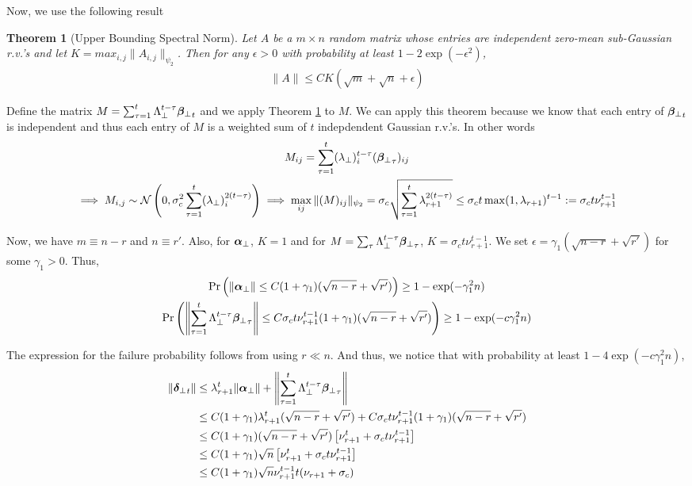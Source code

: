 \documentclass[10pt]{article}
\newtheorem{theorem}{Theorem}
\newcommand{\norm}[1]{\left\|#1\right\|}
\begin{document}
Now, we use the following result \cite[Theorem 4.4.5]{hdp_book} 
\begin{theorem}[Upper Bounding Spectral Norm] \label{thm:upper_bnd}
Let $A$ be a $m \times n$ random matrix whose entries are independent zero-mean sub-Gaussian r.v.'s and let $K = max_{i,j} \|A_{i,j}\|_{\psi_2}$. Then for any $\epsilon >0$ with probability at least $1 - 2\exp(-\epsilon^2)$,
\begin{align*}
\|A\| \leq C K (\sqrt{m} + \sqrt{n} + \epsilon) 
\end{align*}
\end{theorem}

Define the matrix $M = \sum_{\tau=1}^t \Lambda_\perp^{t-\tau}  {\bm{\beta}_{\perp}}_t$ and we apply Theorem \ref{thm:upper_bnd} to $M$. We can apply this theorem because we know that each entry of ${\bm{\beta}_{\perp}}_t$ is independent and thus each entry of $M$ is a weighted sum of $t$ indepdendent Gaussian r.v.'s. In other words
\begin{gather*}
M_{ij} = \sum_{\tau=1}^t (\lambda_\perp)_i^{t-\tau} ({\bm{\beta}_{\perp}}_{\tau})_{ij} \\
\implies M_{i,j} \sim \mathcal{N}\left(0, \sigma_c^2 \sum_{\tau=1}^t (\lambda_\perp)_i^{2(t-\tau)}\right)
\implies \max_{ij} \|(M)_{ij}\|_{\psi_2} = \sigma_c \sqrt{\sum_{\tau=1}^t \lambda_{r+1}^{2(t-\tau)}} \leq \sigma_c t \max(1, \lambda_{r+1})^{t-1} := \sigma_c t \nu_{r+1}^{t-1} 
\end{gather*}

Now, we have $m \equiv n-r$ and $n \equiv r'$. Also, for $\bm{\alpha}_{\perp}$, $K = 1$ and for $M = \sum_{\tau} \Lambda_\perp^{t-\tau}{\bm{\beta}_{\perp}}_\tau$, $K = \sigma_c t \nu_{r+1}^{t-1}$. We set $\epsilon = \gamma_1 (\sqrt{n-r} + \sqrt{r'})$ for some $\gamma_1 > 0$. Thus, 
\begin{gather*}
\Pr\left(\|\usin\| \leq C (1 + \gamma_1)(\sqrt{n-r} + \sqrt{r'})\right) \geq  1 - \exp(- \gamma_1^2 n) \\
\Pr\left(\norm{\sum_{\tau=1}^t \Lambda_\perp^{t-\tau} \wsin_\tau} \leq C \sigma_c t \nu_{r+1}^{t-1} (1 + \gamma_1)(\sqrt{n-r} + \sqrt{r'}) \right) \geq  1 - \exp(- c\gamma_1^2 n)
\end{gather*}

%
The expression for the failure probability follows from using $r \ll n$. And thus, we notice that with probability at least $1 - 4 \exp(- c\gamma_1^2 n)$, 
\begin{align*}
\|\utsin_t\| &\leq \lambda_{r+1}^t \|\usin\| + \norm{\sum_{\tau=1}^t \Lambda_\perp^{t-\tau} \wsin_\tau} \\
&\leq C(1+\gamma_1) \lambda_{r+1}^t(\sqrt{n-r} + \sqrt{r'}) + C \sigma_c t \nu_{r+1}^{t-1} (1 + \gamma_1)(\sqrt{n-r} + \sqrt{r'}) \\
&\leq C (1 + \gamma_1) (\sqrt{n-r} + \sqrt{r'}) \left[ \nu_{r+1}^t + \sigma_c t \nu_{r+1}^{t-1} \right] \\
&\leq C (1+ \gamma_1) \sqrt{n} \left[\nu_{r+1}^t +  \sigma_c t \nu_{r+1}^{t-1}  \right] \\
&\leq C (1+ \gamma_1) \sqrt{n} \nu_{r+1}^{t-1} t (\nu_{r+1} + \sigma_c) 
\end{align*}
\end{document}
